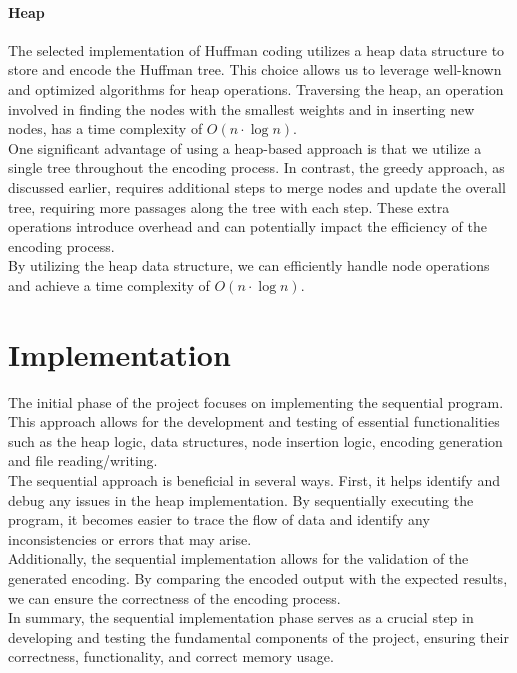 \documentclass[10pt]{article}
\begin{document}
\paragraph{Heap}The selected implementation of Huffman coding utilizes a heap data structure to store and encode the Huffman tree. This choice allows us to leverage well-known and optimized algorithms for heap operations. Traversing the heap, an operation involved in finding the nodes with the smallest weights and in inserting new nodes, has a time complexity of $O(n\cdot\log n)$.\\
One significant advantage of using a heap-based approach is that we utilize a single tree throughout the encoding process. In contrast, the greedy approach, as discussed earlier, requires additional steps to merge nodes and update the overall tree, requiring more passages along the tree with each step. These extra operations introduce overhead and can potentially impact the efficiency of the encoding process.\\
By utilizing the heap data structure, we can efficiently handle node operations and achieve a time complexity of $O(n\cdot\log n)$.
\pagebreak
\section{Implementation}
The initial phase of the project focuses on implementing the sequential program. This approach allows for the development and testing of essential functionalities such as the heap logic, data structures, node insertion logic, encoding generation and file reading/writing.\\
The sequential approach is beneficial in several ways. First, it helps identify and debug any issues in the heap implementation. By sequentially executing the program, it becomes easier to trace the flow of data and identify any inconsistencies or errors that may arise.\\
Additionally, the sequential implementation allows for the validation of the generated encoding. By comparing the encoded output with the expected results, we can ensure the correctness of the encoding process.\\
In summary, the sequential implementation phase serves as a crucial step in developing and testing the fundamental components of the project, ensuring their correctness, functionality, and correct memory usage.
\end{document}
